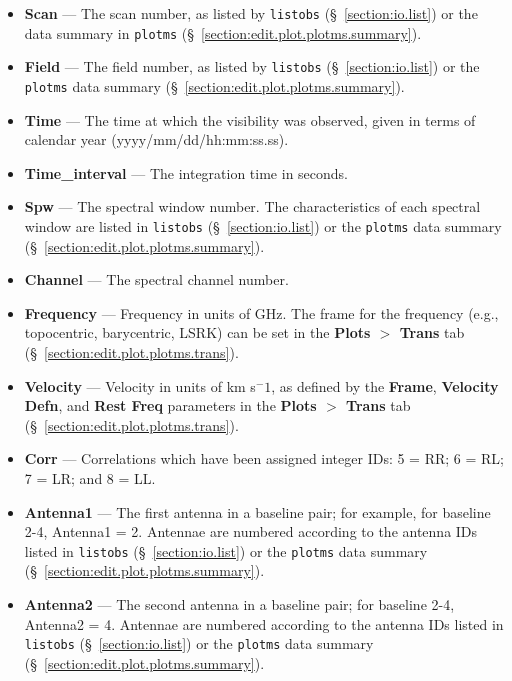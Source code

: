 \begin{itemize}
\item {\bf Scan} --- The scan number, as listed by {\tt listobs} (\S~\ref{section:io.list}) or the data summary in {\tt plotms} (\S~\ref{section:edit.plot.plotms.summary}).

\item {\bf Field} --- The field number, as listed by {\tt listobs} (\S~\ref{section:io.list}) or the {\tt plotms} data summary (\S~\ref{section:edit.plot.plotms.summary}).

\item {\bf Time} --- The time at which the visibility was observed, given in terms of calendar year (yyyy/mm/dd/hh:mm:ss.ss).

\item {\bf Time\_interval} --- The integration time in seconds.

\item {\bf Spw} --- The spectral window number. The characteristics of each spectral window are listed in {\tt listobs} (\S~\ref{section:io.list}) or the {\tt plotms} data summary (\S~\ref{section:edit.plot.plotms.summary}).

\item {\bf Channel} --- The spectral channel number.

\item {\bf Frequency} --- Frequency in units of GHz. The frame for the frequency (e.g., topocentric, barycentric, LSRK) can be set in the {\bf Plots $>$ Trans} tab (\S~\ref{section:edit.plot.plotms.trans}).

\item {\bf Velocity} --- Velocity in units of km s$^-1$, as defined by the {\bf Frame}, {\bf Velocity Defn}, and {\bf Rest Freq} parameters in the {\bf Plots $>$ Trans} tab (\S~\ref{section:edit.plot.plotms.trans}).

\item {\bf Corr} --- Correlations which have been assigned integer IDs:  5 = RR; 6 = RL; 7 = LR; and 8 = LL.

\item {\bf Antenna1} --- The first antenna in a baseline pair; for example, for baseline 2-4, Antenna1 = 2. Antennae are numbered according to the antenna IDs listed in {\tt listobs} (\S~\ref{section:io.list}) or the {\tt plotms} data summary (\S~\ref{section:edit.plot.plotms.summary}).

\item {\bf Antenna2} --- The second antenna in a baseline pair; for baseline 2-4, Antenna2 = 4. Antennae are numbered according to the antenna IDs listed in {\tt listobs} (\S~\ref{section:io.list}) or the {\tt plotms} data summary (\S~\ref{section:edit.plot.plotms.summary}).


\end{itemize}
